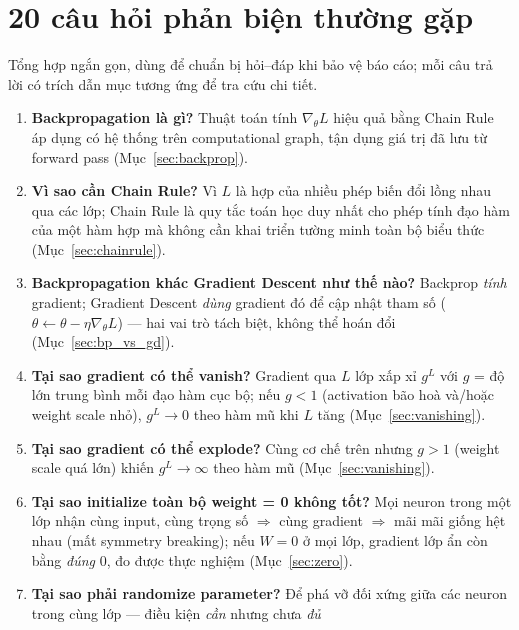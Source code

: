 \documentclass[12pt,a4paper]{article}
\begin{document}
\section{20 câu hỏi phản biện thường gặp}
\label{app:faq}

Tổng hợp ngắn gọn, dùng để chuẩn bị hỏi--đáp khi bảo vệ báo cáo; mỗi câu
trả lời có trích dẫn mục tương ứng để tra cứu chi tiết.

\begin{enumerate}
\item \textbf{Backpropagation là gì?} Thuật toán tính $\nabla_\theta L$
  hiệu quả bằng Chain Rule áp dụng có hệ thống trên computational graph,
  tận dụng giá trị đã lưu từ forward pass (Mục~\ref{sec:backprop}).
\item \textbf{Vì sao cần Chain Rule?} Vì $L$ là hợp của nhiều phép biến
  đổi lồng nhau qua các lớp; Chain Rule là quy tắc toán học duy nhất cho
  phép tính đạo hàm của một hàm hợp mà không cần khai triển tường minh
  toàn bộ biểu thức (Mục~\ref{sec:chainrule}).
\item \textbf{Backpropagation khác Gradient Descent như thế nào?}
  Backprop \emph{tính} gradient; Gradient Descent \emph{dùng} gradient đó
  để cập nhật tham số ($\theta\leftarrow\theta-\eta\nabla_\theta L$) ---
  hai vai trò tách biệt, không thể hoán đổi (Mục~\ref{sec:bp_vs_gd}).
\item \textbf{Tại sao gradient có thể vanish?} Gradient qua $L$ lớp xấp xỉ
  $g^L$ với $g$ = độ lớn trung bình mỗi đạo hàm cục bộ; nếu $g<1$ (activation
  bão hoà và/hoặc weight scale nhỏ), $g^L\to0$ theo hàm mũ khi $L$ tăng
  (Mục~\ref{sec:vanishing}).
\item \textbf{Tại sao gradient có thể explode?} Cùng cơ chế trên nhưng
  $g>1$ (weight scale quá lớn) khiến $g^L\to\infty$ theo hàm mũ
  (Mục~\ref{sec:vanishing}).
\item \textbf{Tại sao initialize toàn bộ weight = 0 không tốt?} Mọi
  neuron trong một lớp nhận cùng input, cùng trọng số $\Rightarrow$ cùng
  gradient $\Rightarrow$ mãi mãi giống hệt nhau (mất symmetry breaking);
  nếu $W{=}0$ ở mọi lớp, gradient lớp ẩn còn bằng \emph{đúng} $0$, đo được
  thực nghiệm (Mục~\ref{sec:zero}).
\item \textbf{Tại sao phải randomize parameter?} Để phá vỡ đối xứng giữa
  các neuron trong cùng lớp --- điều kiện \emph{cần} nhưng chưa \emph{đủ}

\end{enumerate}
\end{document}
